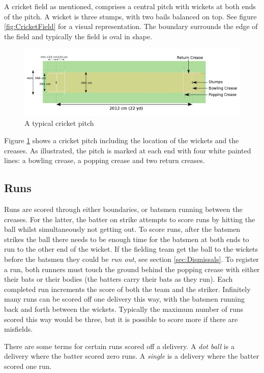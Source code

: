 \documentclass[12pt,a4paper]{report}
\theoremstyle{definition}
\begin{document}
A cricket field as mentioned, comprises a central pitch with wickets at both ends of the pitch. 
A wicket is three stumps, with two bails balanced on top. 
See figure \ref{fig:CricketField} for a visual representation.
The boundary surrounds the edge of the field and typically the field is oval in shape.

\begin{figure}[H]
    \centering
    \includegraphics[width=0.8\linewidth]{Cricket_Pitch.png}
    \caption{A typical cricket pitch \citep{cricketWiki}}
    \label{fig:CricketPitch}
\end{figure}

Figure \ref{fig:CricketPitch} shows a cricket pitch including the location of the wickets and the creases.
As illustrated, the pitch is marked at each end with four white painted lines: a bowling crease, a popping crease and two return creases.

\subsection{Runs} \label{sec:Runs}

Runs are scored through either boundaries, or batsmen running between the creases.
For the latter, the batter on strike attempts to score runs by hitting the ball whilst simultaneously not getting out. 
To score runs, after the batsmen strikes the ball there needs to be enough time for the batsmen at both ends to run to the other end of the wicket.
If the fielding team get the ball to the wickets before the batsmen they could be \emph{run out}, see section \ref{sec:Dismissals}.
To register a run, both runners must touch the ground behind the popping crease with either their bats or their bodies (the batters carry their bats as they run). 
Each completed run increments the score of both the team and the striker.
Infinitely many runs can be scored off one delivery this way, with the batsmen running back and forth between the wickets.
Typically the maximum number of runs scored this way would be three, but it is possible to score more if there are misfields.

There are some terms for certain runs scored off a delivery.
A \emph{dot ball} is a delivery where the batter scored zero runs.
A \emph{single} is a delivery where the batter scored one run.
\end{document}
